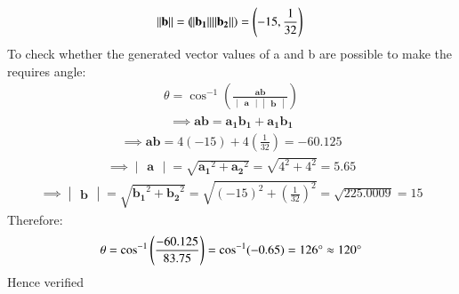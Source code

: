 \documentclass[12pt,-letter paper]{article}
\let\vec\mathbf{}
\let\vec\mathbf{}
\let\vec\mathbf{}
\providecommand{\brak}[1]{\ensuremath{\left(#1\right)}}
\newcommand{\mydet}[1]{\ensuremath{\begin{vmatrix}#1\end{vmatrix}}}
\providecommand{\brak}[1]{\ensuremath{\left(#1\right)}}
\begin{document}
\begin{enumerate}
\begin{align}
  \norm{\vec{b}}=(\norm{\vec{b_1}}\vec{\norm{b_2}}) = \brak{-15,\frac{1}{32}}
 \end{align}
To check whether the generated vector values of a and b are possible to make the requires angle:
 \begin{align}
  \theta = \cos^{-1}\brak{{\frac{\vec{a}\vec{b}}{\mydet{\vec{a}}\mydet{\vec{b}}}}}
   \end{align}
   \begin{align}
   \implies \vec{a}\vec{b} = \vec{a_1} \vec{b_1} + \vec{a_1} \vec{b_1}
     \end{align}
   \begin{align}
   \implies \vec{a}\vec{b} = 4(-15) + 4\brak{\frac{1}{32}} = -60.125
   \end{align}
   \begin{align}
   \implies \mydet{\vec{a}}=\sqrt{\vec{a_1}^2 + \vec{a_2}^2} = \sqrt{4^2 +4^2} = 5.65
   \end{align}
     \begin{align}
     \implies \mydet{\vec{b}}=\sqrt{\vec{b_1}^2 + \vec{b_2}^2} = \sqrt{(-15)^2 +\brak{\frac{1}{32}}^2} = \sqrt{225.0009} = 15
      \end{align}
       Therefore: 
       \begin{align}
       \theta = \cos^{-1}\brak{\frac{-60.125}{83.75}} = \cos^{-1}(-0.65) = 126\degree \approx 120\degree
    \end{align}
    Hence verified
  \end{enumerate}
\end{document}
